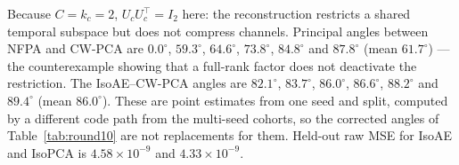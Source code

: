 Because $C=k_c=2$, $U_cU_c^\top=I_2$ here: the reconstruction restricts a shared temporal subspace
but does not compress channels. Principal angles between NFPA and CW-PCA are $0.0^\circ$,
$59.3^\circ$, $64.6^\circ$, $73.8^\circ$, $84.8^\circ$ and $87.8^\circ$ (mean $61.7^\circ$) --- the
counterexample showing that a full-rank factor does not deactivate the restriction. The IsoAE--CW-PCA
angles are $82.1^\circ$, $83.7^\circ$, $86.0^\circ$, $86.6^\circ$, $88.2^\circ$ and $89.4^\circ$
(mean $86.0^\circ$). These are point estimates from one seed and split, computed by a different code
path from the multi-seed cohorts, so the corrected angles of Table~\ref{tab:round10} are not
replacements for them. Held-out raw MSE for IsoAE and IsoPCA is $4.58\times10^{-9}$ and
$4.33\times10^{-9}$.
